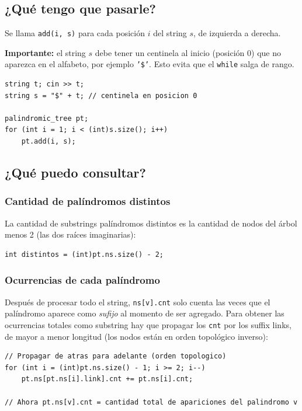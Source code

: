 \subsection{¿Qué tengo que pasarle?}

Se llama \texttt{add(i, s)} para cada posición $i$ del string $s$, de izquierda a derecha.

\textbf{Importante:} el string $s$ debe tener un centinela al inicio (posición 0) que no aparezca en el alfabeto, por ejemplo \texttt{'\$'}. Esto evita que el \texttt{while} salga de rango.

\begin{lstlisting}[style=cppstyle, caption={Uso basico del Palindromic Tree}]
string t; cin >> t;
string s = "$" + t; // centinela en posicion 0

palindromic_tree pt;
for (int i = 1; i < (int)s.size(); i++)
    pt.add(i, s);
\end{lstlisting}

\subsection{¿Qué puedo consultar?}

\subsubsection*{Cantidad de palíndromos distintos}

La cantidad de substrings palíndromos distintos es la cantidad de nodos del árbol menos 2 (las dos raíces imaginarias):

\begin{lstlisting}[style=cppstyle, caption={Contar palindromos distintos}]
int distintos = (int)pt.ns.size() - 2;
\end{lstlisting}

\subsubsection*{Ocurrencias de cada palíndromo}

Después de procesar todo el string, \texttt{ns[v].cnt} solo cuenta las veces que el palíndromo aparece como \textit{sufijo} al momento de ser agregado. Para obtener las ocurrencias totales como substring hay que propagar los \texttt{cnt} por los suffix links, de mayor a menor longitud (los nodos están en orden topológico inverso):

\begin{lstlisting}[style=cppstyle, caption={Propagar cnt para obtener ocurrencias totales}]
// Propagar de atras para adelante (orden topologico)
for (int i = (int)pt.ns.size() - 1; i >= 2; i--)
    pt.ns[pt.ns[i].link].cnt += pt.ns[i].cnt;

// Ahora pt.ns[v].cnt = cantidad total de apariciones del palindromo v
\end{lstlisting}

